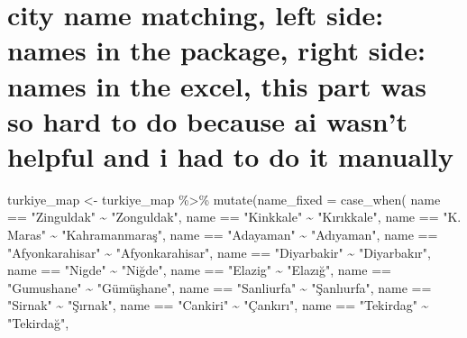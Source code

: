 \documentclass[
  11pt,
  a4paper,
  DIV=11,
  numbers=noendperiod]{scrartcl}
\newenvironment{Shaded}{\begin{snugshade}}{\end{snugshade}}
\newcommand{\AttributeTok}[1]{\textcolor[rgb]{0.40,0.45,0.13}{#1}}
\newcommand{\FunctionTok}[1]{\textcolor[rgb]{0.28,0.35,0.67}{#1}}
\newcommand{\NormalTok}[1]{\textcolor[rgb]{0.00,0.23,0.31}{#1}}
\newcommand{\OtherTok}[1]{\textcolor[rgb]{0.00,0.23,0.31}{#1}}
\newcommand{\SpecialCharTok}[1]{\textcolor[rgb]{0.37,0.37,0.37}{#1}}
\newcommand{\StringTok}[1]{\textcolor[rgb]{0.13,0.47,0.30}{#1}}
\begin{document}
\section{city name matching, left side: names in the package, right
side: names in the excel, this part was so hard to do because ai wasn't
helpful and i had to do it
manually}\label{city-name-matching-left-side-names-in-the-package-right-side-names-in-the-excel-this-part-was-so-hard-to-do-because-ai-wasnt-helpful-and-i-had-to-do-it-manually}

\begin{Shaded}
\begin{Highlighting}[]
\NormalTok{turkiye\_map }\OtherTok{\textless{}{-}}\NormalTok{ turkiye\_map }\SpecialCharTok{\%\textgreater{}\%}
  \FunctionTok{mutate}\NormalTok{(}\AttributeTok{name\_fixed =} \FunctionTok{case\_when}\NormalTok{(}
\NormalTok{    name }\SpecialCharTok{==} \StringTok{"Zinguldak"}      \SpecialCharTok{\textasciitilde{}} \StringTok{"Zonguldak"}\NormalTok{,}
\NormalTok{    name }\SpecialCharTok{==} \StringTok{"Kinkkale"}       \SpecialCharTok{\textasciitilde{}} \StringTok{"Kırıkkale"}\NormalTok{,}
\NormalTok{    name }\SpecialCharTok{==} \StringTok{"K. Maras"}       \SpecialCharTok{\textasciitilde{}} \StringTok{"Kahramanmaraş"}\NormalTok{,}
\NormalTok{    name }\SpecialCharTok{==} \StringTok{"Adayaman"}       \SpecialCharTok{\textasciitilde{}} \StringTok{"Adıyaman"}\NormalTok{,}
\NormalTok{    name }\SpecialCharTok{==} \StringTok{"Afyonkarahisar"} \SpecialCharTok{\textasciitilde{}} \StringTok{"Afyonkarahisar"}\NormalTok{,}
\NormalTok{    name }\SpecialCharTok{==} \StringTok{"Diyarbakir"}     \SpecialCharTok{\textasciitilde{}} \StringTok{"Diyarbakır"}\NormalTok{,}
\NormalTok{    name }\SpecialCharTok{==} \StringTok{"Nigde"}          \SpecialCharTok{\textasciitilde{}} \StringTok{"Niğde"}\NormalTok{,}
\NormalTok{    name }\SpecialCharTok{==} \StringTok{"Elazig"}         \SpecialCharTok{\textasciitilde{}} \StringTok{"Elazığ"}\NormalTok{,}
\NormalTok{    name }\SpecialCharTok{==} \StringTok{"Gumushane"}      \SpecialCharTok{\textasciitilde{}} \StringTok{"Gümüşhane"}\NormalTok{,}
\NormalTok{    name }\SpecialCharTok{==} \StringTok{"Sanliurfa"}      \SpecialCharTok{\textasciitilde{}} \StringTok{"Şanlıurfa"}\NormalTok{,}
\NormalTok{    name }\SpecialCharTok{==} \StringTok{"Sirnak"}         \SpecialCharTok{\textasciitilde{}} \StringTok{"Şırnak"}\NormalTok{,}
\NormalTok{    name }\SpecialCharTok{==} \StringTok{"Cankiri"}        \SpecialCharTok{\textasciitilde{}} \StringTok{"Çankırı"}\NormalTok{,}
\NormalTok{    name }\SpecialCharTok{==} \StringTok{"Tekirdag"}       \SpecialCharTok{\textasciitilde{}} \StringTok{"Tekirdağ"}\NormalTok{,}

\end{Highlighting}
\end{Shaded}
\end{document}
